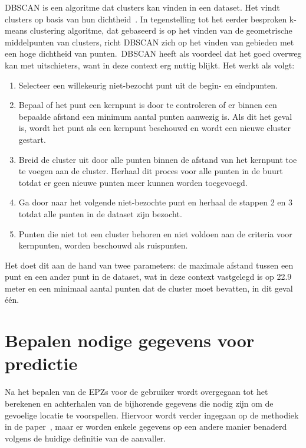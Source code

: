 \ac{DBSCAN} is een algoritme dat clusters kan vinden in een dataset. Het vindt
clusters op basis van hun dichtheid~\cite{KMeansvs80:online}. In tegenstelling tot het eerder besproken
k-means clustering algoritme, dat gebaseerd is
op het vinden van de geometrische middelpunten van clusters, richt \ac{DBSCAN}
zich op het vinden van gebieden met een hoge dichtheid van punten.\ \ac{DBSCAN}
heeft als voordeel dat het goed overweg kan met uitschieters, want in deze
context erg nuttig blijkt. Het werkt als volgt:
\begin{enumerate}
    \item Selecteer een willekeurig niet-bezocht punt uit de begin- en eindpunten.
    \item Bepaal of het punt een kernpunt is door te controleren of er binnen een
          bepaalde afstand een minimum aantal punten aanwezig is. Als dit het geval is,
          wordt het punt als een kernpunt beschouwd en wordt een nieuwe cluster gestart.
    \item Breid de cluster uit door alle punten binnen de afstand van het kernpunt toe te
          voegen aan de cluster. Herhaal dit proces voor alle punten in de buurt totdat
          er geen nieuwe punten meer kunnen worden toegevoegd.
    \item Ga door naar het volgende niet-bezochte punt en herhaal de stappen 2 en 3
          totdat alle punten in de dataset zijn bezocht.
    \item Punten die niet tot een cluster behoren en niet voldoen aan de criteria voor
          kernpunten, worden beschouwd als ruispunten.
\end{enumerate}
Het doet dit aan de hand van twee parameters: de maximale afstand tussen een punt en
een ander punt in de dataset, wat in deze context vastgelegd is op 22.9 meter en een minimaal aantal punten dat de cluster moet
bevatten, in dit geval één.

\section{Bepalen nodige gegevens voor predictie}
Na het bepalen van de \acp{EPZ} voor de gebruiker wordt overgegaan tot het
berekenen en achterhalen van de bijhorende gegevens die nodig zijn om de
gevoelige locatie te voorspellen. Hiervoor wordt verder ingegaan op de
methodiek in de
paper~\citeauthor{Dhondt}, maar er
worden enkele gegevens op een andere manier benaderd volgens de huidige
definitie van de aanvaller.

